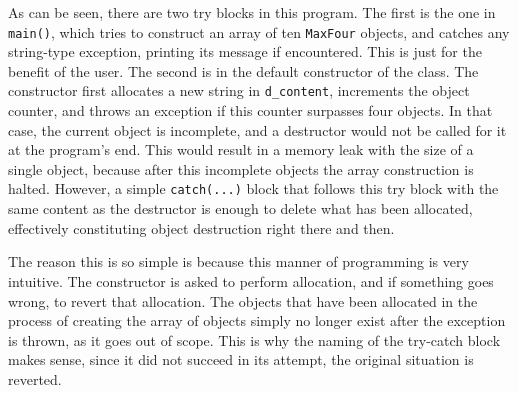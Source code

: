 As can be seen, there are two try blocks in this program. The first is the one in \texttt{main()}, which tries to construct an array of ten \texttt{MaxFour} objects, and catches any string-type exception, printing its message if encountered. This is just for the benefit of the user. The second is in the default constructor of the class. The constructor first allocates a new string in \texttt{d\_content}, increments the object counter, and throws an exception if this counter surpasses four objects. In that case, the current object is incomplete, and a destructor would not be called for it at the program's end. This would result in a memory leak with the size of a single object, because after this incomplete objects the array construction is halted. However, a simple \texttt{catch(...)} block that follows this try block with the same content as the destructor is enough to delete what has been allocated, effectively constituting object destruction right there and then.

The reason this is so simple is because this manner of programming is very intuitive. The constructor is asked to perform allocation, and if something goes wrong, to revert that allocation. The objects that have been allocated in the process of creating the array of objects simply no longer exist after the exception is thrown, as it goes out of scope. This is why the naming of the try-catch block makes sense, since it did not succeed in its attempt, the original situation is reverted.
